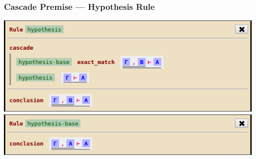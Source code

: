 \documentclass[notes]{beamer}
\begin{document}
\begin{frame}
  \frametitle{Cascade Premise --- Hypothesis Rule}

\begin{center}
\includegraphics[width=0.8\linewidth,height=\textheight,keepaspectratio]{demo-rule-hypo}\\[1em]
\includegraphics[width=0.8\linewidth,height=\textheight,keepaspectratio]{demo-rule-hypo-base}
\end{center}
\end{frame}
\end{document}
